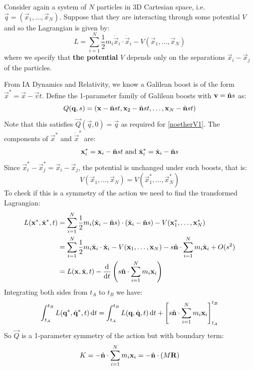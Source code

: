 \documentclass[../main.tex]{subfiles}
\begin{document}
\begin{example}
  Consider again a system of $N$ particles in 3D Cartesian space, i.e. $\vec{q} = (\vec{x}_1, \ldots, \vec{x}_N)$.
  Suppose that they are interacting through some potential $V$ and so the Lagrangian is given by:
  \[
    L = \sum_{i = 1}^{N} \frac{1}{2} m_i \dot{\vec{x}}_i \cdot \dot{\vec{x}}_i - V(\vec{x}_1, \ldots, \vec{x}_N)
  \]
  where we specify that \textbf{the potential} $V$ depends only on the separations $\vec{x}_i - \vec{x}_j$ of the particles.

  From IA Dynamics and Relativity, we know a Galilean boost is of the form $\vec{x}^{*} = \vec{x} - \vec{v}t$.
  Define the 1-parameter family of Galilean boosts with $\mathbf{\bm{v}} = \hat{\mathbf{\bm{n}}} s$ as:
  \[
    Q(\mathbf{\bm{q}}, s) = (\mathbf{\bm{x}} - \hat{\mathbf{\bm{n}}} st, \mathbf{\bm{x}}_2 - \hat{\mathbf{\bm{n}}} st, \ldots, \mathbf{\bm{x}}_{N} - \hat{\mathbf{\bm{n}}} st)
  \]
  Note that this satisfies $\vec{Q}(\vec{q}, 0) = \vec{q}$ as required for \cref{noetherV1}.
  The components of $\vec{x}^{*}$ and $\dot{\vec{x}}^{*}$ are:
  \[
    \mathbf{\bm{x}}^{*}_i = \mathbf{\bm{x}}_i - \hat{\mathbf{\bm{n}}}st \text{ and } \dot{\mathbf{\bm{x}}}^{*}_i = \dot{\mathbf{\bm{x}}}_i - \hat{\mathbf{\bm{n}}} s
  \]
  Since $\vec{x}^{*}_i - \vec{x}^{*}_j = \vec{x}_i - \vec{x}_j$, the potential is unchanged under such boosts, that is:
  \[
    V(\vec{x}_1, \ldots, \vec{x}_N) = V(\vec{x}^{*}_{1}, \ldots, \vec{x}^{*}_{N})
  \]
  To check if this is a symmetry of the action we need to find the transformed Lagrangian:
  \begin{align*}
    L(\vec{x}^{*}, \dot{\vec{x}}^{*}, t) &= \sum_{i = 1}^{N} \frac{1}{2} m_i (\dot{\vec{x}}_i - \uvec{n} s) \cdot (\dot{\vec{x}}_i - \uvec{n} s)  - V(\vec{x}^{*}_1, \ldots, \vec{x}^{*}_N) \\
                                         &= \sum_{i = 1}^{N} \frac{1}{2} m_i \dot{\vec{x}}_i \cdot \dot{\vec{x}}_i - V(\vec{x}_1, \ldots, \vec{x}_N) - s \uvec{n} \cdot \sum_{i = 1}^{N} m_i \dot{\vec{x}}_i + O(s^2) \\
                                         &= L(\vec{x}, \dot{\vec{x}}, t) - \deriv{}{t}\left(s \uvec{n} \cdot \sum_{i = 1}^{N} m_i \vec{x}_i\right)
  \end{align*}
  Integrating both sides from $t_{A}$ to $t_{B}$ we have:
  \[
    \int_{t_A}^{t_B} L(\vec{q}^{*}, \dot{\vec{q}}^{*}, t) \d{t} = \int_{t_A}^{t_B} L(\vec{q}, \dot{\vec{q}}, t) \d{t} + \eval{s \uvec{n} \cdot \sum_{i = 1}^{N} m_i \vec{x}_i}{t_A}{t_B}
  \]
  So $\vec{Q}$ is a 1-parameter symmetry of the action but with boundary term:
  \[
    K = - \hat{\mathbf{\bm{n}}} \cdot \sum_{i = 1}^{N} m_i \mathbf{\bm{x}}_i = - \hat{\mathbf{\bm{n}}} \cdot (M \mathbf{\bm{R}})
\]
\end{example}
\end{document}
